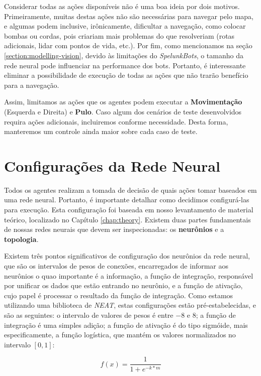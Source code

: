 Considerar todas as ações disponíveis não é uma boa ideia por dois motivos.
Primeiramente, muitas destas ações não são necessárias para navegar pelo mapa, e
algumas podem inclusive, irônicamente, dificultar a navegação, como colocar
bombas ou cordas, pois criariam mais problemas do que resolveriam (rotas
adicionais, lidar com pontos de vida, etc.). Por fim, como mencionamos na seção
\ref{section:modelling-vision}, devido às limitações do \textit{SpelunkBots}, o
tamanho da rede neural pode influenciar na performance dos bots. Portanto, é
interessante eliminar a possibilidade de execução de todas as ações que não
trarão benefício para a navegação.

Assim, limitamos as ações que os agentes podem executar a \textbf{Movimentação}
(Esquerda e Direita) e \textbf{Pulo}. Caso algum dos cenários de teste
desenvolvidos requira ações adicionais, incluiremos conforme necessidade. Desta
forma, manteremos um controle ainda maior sobre cada caso de teste.


\section{\label{section:modelling-network}Configurações da Rede Neural}
Todos os agentes realizam a tomada de decisão de quais ações tomar baseados em
uma rede neural. Portanto, é importante detalhar como decidimos configurá-las
para execução. Esta configuração foi baseada em nosso levantamento de material
teórico, localizado no Capítulo \ref{chap:theory}. Existem duas partes
fundamentais de nossas redes neurais que devem ser inspecionadas: os
\textbf{neurônios} e a \textbf{topologia}.

Existem três pontos significativos de configuração dos neurônios da rede neural,
que são os intervalos de pesos de conexões, encarregados de informar aos
neurônios o quao importante é a informação, a função de integração, responsável
por unificar os dados que estão entrando no neurônio, e a função de ativação,
cujo papel é processar o resultado da função de integração. Como estamos
utilizando uma biblioteca de \textit{NEAT}, estas configurações estão
pré-estabelecidas, e são as seguintes: o intervalo de valores de pesos é entre
$-8$ e $8$; a função de integração é uma simples adição; a função de ativação é
do tipo sigmóide, mais especificamente, a função logística, que mantém os
valores normalizados no intervalo $[0,1]$:

\begin{equation}
	\label{eq:neat-activation}
	f(x) = \frac{1}{1+e^{-k*m}}
\end{equation}

